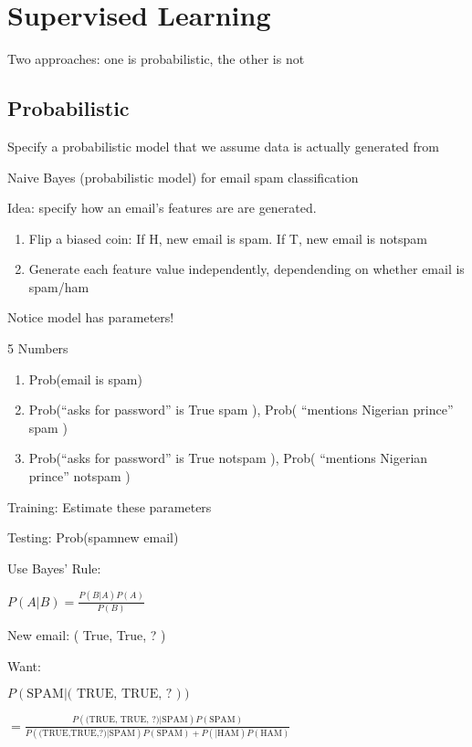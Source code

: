 \documentclass[twoside]{article}
\begin{document}
\section{Supervised Learning}

Two approaches: one is probabilistic, the other is not

\subsection{Probabilistic}

Specify a probabilistic model that we assume data is actually generated from

Naive Bayes (probabilistic model) for email spam classification

Idea: specify how an email's features are are generated.

\begin{enumerate}
\item Flip a biased coin: If H, new email is spam. If T, new email is notspam
\item Generate each feature value independently, dependending on whether email is spam/ham
\end{enumerate}

Notice model has parameters!

5 Numbers
\begin{enumerate}
\item Prob(email is spam)
\item Prob(``asks for password'' is True \textbar spam ), Prob( ``mentions Nigerian prince'' \textbar spam )
\item Prob(``asks for password'' is True \textbar notspam ), Prob( ``mentions Nigerian prince'' \textbar notspam )
\end{enumerate}

Training: Estimate these parameters

Testing: Prob(spam\textbar new email)

Use Bayes' Rule:

$P(A|B) = \frac{P(B|A)P(A)}{P(B)}$

New email: ( True, True, ? )

Want:

$P( \text{SPAM} | \text{( TRUE, TRUE, ? )})$

$ = \frac{P( \text{(TRUE, TRUE, ?)} | \text{SPAM} )P(\text{SPAM}) }{P( \text{(TRUE,TRUE,?)}|\text{SPAM})P(\text{SPAM}) + P(\text{}|\text{HAM})P(\text{HAM})}$
\end{document}
